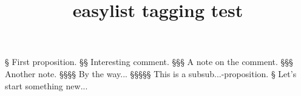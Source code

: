 \documentclass{article}
\title{easylist tagging test}
\begin{document}
\begin{easylist}
§ First proposition.
§§ Interesting comment.
§§§ A note on the comment.
§§§ Another note.
§§§§ By the way...
§§§§§ This is a subsub...-proposition.
§ Let’s start something new...
\end{easylist}
\end{document}
